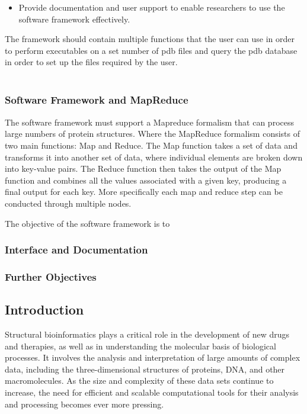 \documentclass[]{final_report}
\begin{document}
\begin{itemize}
    \item Provide documentation and user support to enable researchers to use the software framework effectively.
\end{itemize}
The framework should contain multiple functions that the user can use in order to perform executables on a set number of pdb files and query the pdb database in order to set up the files required by the user.\\\\

\subsubsection{Software Framework and MapReduce}
The software framework must support a Mapreduce formalism that can process large numbers of protein structures. Where the MapReduce formalism consists of two main functions: Map and Reduce. The Map function takes a set of data and transforms it into another set of data, where individual elements are broken down into key-value pairs. The Reduce function then takes the output of the Map function and combines all the values associated with a given key, producing a final output for each key. More specifically each map and reduce step can be conducted through multiple nodes.

The objective of the software framework is to 


\subsubsection{Interface and Documentation}
\subsubsection{Further Objectives}


\subsection{Introduction}
Structural bioinformatics plays a critical role in the development of new drugs and therapies, as well as in understanding the molecular basis of biological processes. It involves the analysis and interpretation of large amounts of complex data, including the three-dimensional structures of proteins, DNA, and other macromolecules. As the size and complexity of these data sets continue to increase, the need for efficient and scalable computational tools for their analysis and processing becomes ever more pressing.
\end{document}
